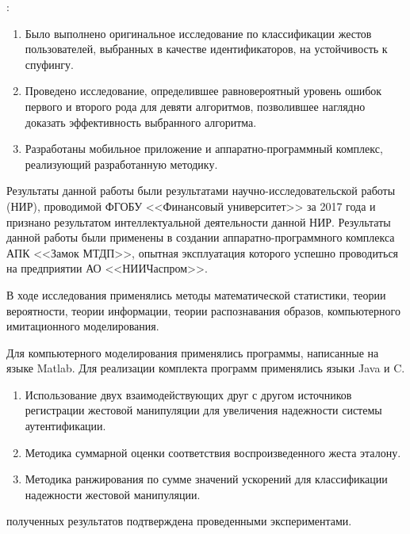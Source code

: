 {\influence}: 

\begin{enumerate}
	\item Было выполнено оригинальное исследование по классификации жестов пользователей, выбранных в качестве идентификаторов, на устойчивость к спуфингу.
	\item Проведено исследование, определившее равновероятный уровень ошибок первого и второго рода для девяти алгоритмов, позволившее наглядно доказать эффективность выбранного алгоритма.
	\item Разработаны мобильное приложение и аппаратно-программный комплекс, реализующий разработанную методику. 
\end{enumerate}

Результаты данной работы были результатами научно-исследовательской работы (НИР), проводимой  ФГОБУ <<Финансовый университет>> за 2017 года и признано результатом интеллектуальной деятельности данной НИР. Результаты данной работы были применены в создании аппаратно-программного комплекса АПК <<Замок МТДП>>, опытная эксплуатация которого успешно проводиться на предприятии АО <<НИИЧаспром>>.

{\methods} В ходе исследования применялись методы математической статистики, теории вероятности, теории информации, теории распознавания образов, компьютерного имитационного моделирования. 

Для компьютерного моделирования применялись программы, написанные на языке Matlab. Для реализации комплекта программ применялись языки Java и C.

{}
\begin{enumerate}
  \item Использование двух взаимодействующих друг с другом источников регистрации жестовой манипуляции для увеличения надежности системы аутентификации.
  \item Методика суммарной оценки соответствия воспроизведенного жеста эталону.
  \item Методика ранжирования по сумме значений ускорений для классификации надежности жестовой манипуляции. 
\end{enumerate}

{\reliability} полученных результатов подтверждена проведенными экспериментами.


